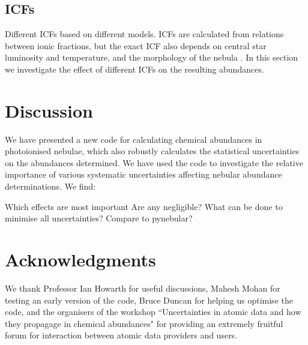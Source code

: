 \documentclass[useAMS,usenatbib]{mn2e}
\begin{document}
\subsection{ICFs}

Different ICFs based on different models.  ICFs are calculated from relations between ionic fractions, but the exact ICF also depends on central star luminosity and temperature, and the morphology of the nebula \citep{2011arXiv1110.2709G}.  In this section we investigate the effect of different ICFs on the resulting abundances.

\section{Discussion}

We have presented a new code for calculating chemical abundances in photoionised nebulae, which also robustly calculates the statistical uncertainties on the abundances determined.  We have used the code to investigate the relative importance of various systematic uncertainties affecting nebular abundance determinations.  We find:

Which effects are most important
Are any negligible?
What can be done to minimise all uncertainties?
Compare to pynebular?

\section*{Acknowledgments}

We thank Professor Ian Howarth for useful discussions, Mahesh Mohan for testing an early version of the code, Bruce Duncan for helping us optimise the code, and the organisers of the workshop ``Uncertainties in atomic data and how they propagage in chemical abundances" for providing an extremely fruitful forum for interaction between atomic data providers and users.





\label{lastpage}
\end{document}
